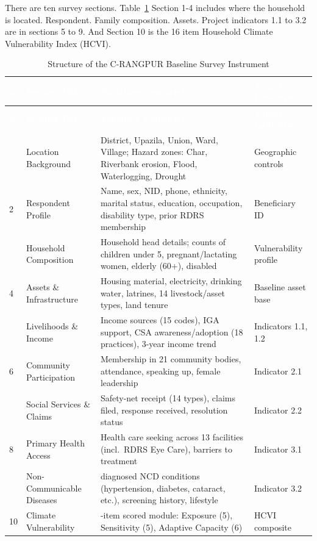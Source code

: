 \documentclass[12pt,a4paper]{report}
\newcommand{\headercell}[1]{\textcolor{white}{\textbf{#1}}}
\begin{document}
There are ten survey sections. Table~\ref{tab:crangpur-sections} Section 1-4 includes where the household is located. Respondent. Family composition. Assets. Project indicators 1.1 to 3.2 are in sections 5 to 9. And Section 10 is the 16 item Household Climate Vulnerability Index (HCVI).

{\small
\begin{longtable}{|>{\raggedright\arraybackslash}p{0.7cm}|>{\raggedright\arraybackslash}p{3.4cm}|>{\raggedright\arraybackslash}p{6.4cm}|>{\raggedright\arraybackslash}p{2.7cm}|}
\caption{Structure of the C-RANGPUR Baseline Survey Instrument}\label{tab:crangpur-sections}\\
\hline
\rowcolor{RDRSBlue}\headercell{\#} & \headercell{Section Title} & \headercell{Variables Captured} & \headercell{Target Indicator} \\ \hline
\endfirsthead
\hline
\rowcolor{RDRSBlue}\headercell{\#} & \headercell{Section Title} & \headercell{Variables Captured} & \headercell{Target Indicator} \\ \hline
\endhead
\hline
\endfoot
\hline
\endlastfoot
1 & Location Background & District, Upazila, Union, Ward, Village; Hazard zones: Char, Riverbank erosion, Flood, Waterlogging, Drought & Geographic controls \\ \hline
\rowcolor{RDRSLight} 2 & Respondent Profile & Name, sex, NID, phone, ethnicity, marital status, education, occupation, disability type, prior RDRS membership & Beneficiary ID \\ \hline
3 & Household Composition & Household head details; counts of children under 5, pregnant/lactating women, elderly (60+), disabled & Vulnerability profile \\ \hline
\rowcolor{RDRSLight} 4 & Assets \& Infrastructure & Housing material, electricity, drinking water, latrines, 14 livestock/asset types, land tenure & Baseline asset base \\ \hline
5 & Livelihoods \& Income & Income sources (15 codes), IGA support, CSA awareness/adoption (18 practices), 3-year income trend & Indicators 1.1, 1.2 \\ \hline
\rowcolor{RDRSLight} 6 & Community Participation & Membership in 21 community bodies, attendance, speaking up, female leadership & Indicator 2.1 \\ \hline
7 & Social Services \& Claims & Safety-net receipt (14 types), claims filed, response received, resolution status & Indicator 2.2 \\ \hline
\rowcolor{RDRSLight} 8 & Primary Health Access & Health care seeking across 13 facilities (incl.\ RDRS Eye Care), barriers to treatment & Indicator 3.1 \\ \hline
9 & Non-Communicable Diseases & 8 diagnosed NCD conditions (hypertension, diabetes, cataract, etc.), screening history, lifestyle & Indicator 3.2 \\ \hline
\rowcolor{RDRSLight} 10 & Climate Vulnerability & 16-item scored module: Exposure (5), Sensitivity (5), Adaptive Capacity (6) & HCVI composite \\ \hline
\end{longtable}
}
\end{document}
